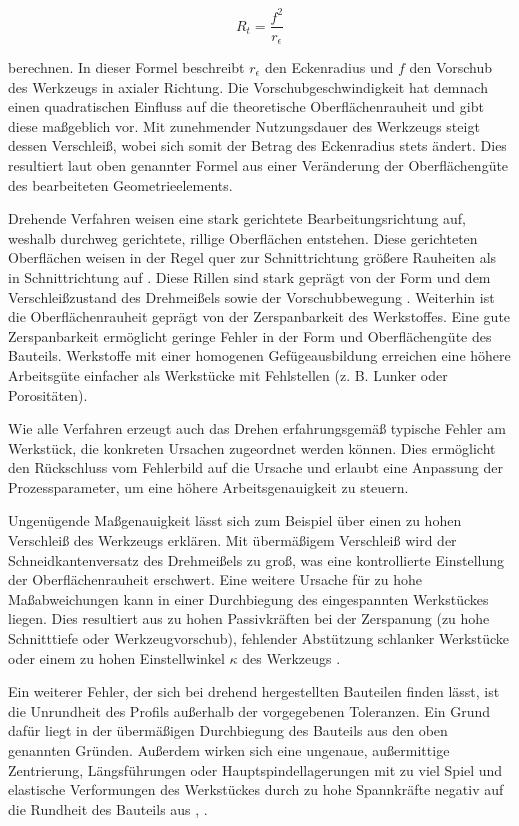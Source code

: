 \begin{equation*}
	R_{t}=\frac{f^{2}}{r_{\epsilon}}
\end{equation*}

berechnen. In dieser Formel beschreibt $r_{\epsilon}$ den Eckenradius und $f$ den Vorschub des Werkzeugs in axialer Richtung. Die Vorschubgeschwindigkeit hat demnach einen quadratischen Einfluss auf die theoretische Oberflächenrauheit und gibt diese maßgeblich vor. Mit zunehmender Nutzungsdauer des Werkzeugs steigt dessen Verschleiß, wobei sich somit der Betrag des Eckenradius stets ändert. Dies resultiert laut oben genannter Formel aus einer Veränderung der Oberflächengüte des bearbeiteten Geometrieelements. 

Drehende Verfahren weisen eine stark gerichtete Bearbeitungsrichtung auf, weshalb durchweg gerichtete, rillige Oberflächen entstehen. Diese gerichteten Oberflächen weisen in der Regel quer zur Schnittrichtung größere Rauheiten als in Schnittrichtung auf \cite{Denkena.2011}.
Diese Rillen sind stark geprägt von der Form und dem Verschleißzustand des Drehmeißels sowie der Vorschubbewegung \cite{Paucksch.2008}.
Weiterhin ist die Oberflächenrauheit geprägt von der Zerspanbarkeit des Werkstoffes. Eine gute Zerspanbarkeit ermöglicht geringe Fehler in der Form und Oberflächengüte des Bauteils. Werkstoffe mit einer homogenen Gefügeausbildung erreichen eine höhere Arbeitsgüte einfacher als Werkstücke mit Fehlstellen (z. B. Lunker oder Porositäten).

Wie alle Verfahren erzeugt auch das Drehen erfahrungsgemäß typische Fehler am Werkstück, die konkreten Ursachen zugeordnet werden können. Dies ermöglicht den Rückschluss vom Fehlerbild auf die Ursache und erlaubt eine Anpassung der Prozessparameter, um eine höhere Arbeitsgenauigkeit zu steuern. 

Ungenügende Maßgenauigkeit lässt sich zum Beispiel über einen zu hohen Verschleiß des Werkzeugs erklären. Mit übermäßigem Verschleiß wird der Schneidkantenversatz des Drehmeißels zu groß, was eine kontrollierte Einstellung der Oberflächenrauheit erschwert. Eine weitere Ursache für zu hohe Maßabweichungen kann in einer Durchbiegung des eingespannten Werkstückes liegen. Dies resultiert aus zu hohen Passivkräften bei der Zerspanung (zu hohe Schnitttiefe oder Werkzeugvorschub), fehlender Abstützung schlanker Werkstücke oder einem zu hohen Einstellwinkel $\kappa$ des Werkzeugs \cite{Schonherr.2002}.

Ein weiterer Fehler, der sich bei drehend hergestellten Bauteilen finden lässt, ist die Unrundheit des Profils außerhalb der vorgegebenen Toleranzen. Ein Grund dafür liegt in der übermäßigen Durchbiegung des Bauteils aus den oben genannten Gründen. Außerdem wirken sich eine ungenaue, außermittige Zentrierung, Längsführungen oder Hauptspindellagerungen mit zu viel Spiel und elastische Verformungen des Werkstückes durch zu hohe Spannkräfte negativ auf die Rundheit des Bauteils aus \cite{Dietrich.2014}, \cite{Schonherr.2002}. 

